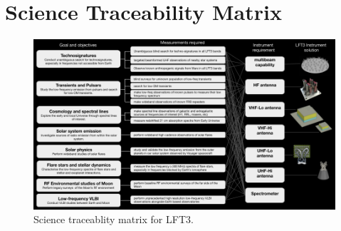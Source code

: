 \documentclass[preprint]{aastex631}
\begin{document}

\newpage
\appendix

\section{Science Traceability Matrix}

\begin{figure}
    \centering
    \includegraphics[width=1.2\linewidth, angle=90]{figures/ScienceTraceabilityMatrix.png}
    \caption{Science traceablity matrix for LFT3.}
    \label{fig:STM}
\end{figure}
    

\newpage
{}

\end{document}
